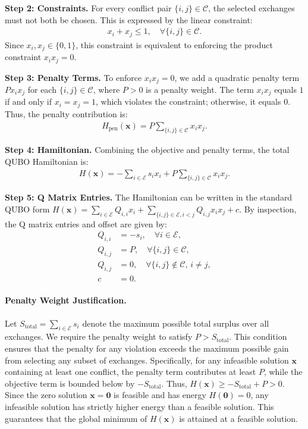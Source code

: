 \documentclass[12pt]{article}
\begin{document}
\textbf{Step 2: Constraints.}
For every conflict pair $\{i, j\} \in \mathcal{C}$, the selected exchanges must not both be chosen. This is expressed by the linear constraint:
\begin{align}
    x_i + x_j \le 1, \quad \forall \{i, j\} \in \mathcal{C}.
\end{align}
Since $x_i, x_j \in \{0, 1\}$, this constraint is equivalent to enforcing the product constraint $x_i x_j = 0$.

\textbf{Step 3: Penalty Terms.}
To enforce $x_i x_j = 0$, we add a quadratic penalty term $P x_i x_j$ for each $\{i, j\} \in \mathcal{C}$, where $P > 0$ is a penalty weight. The term $x_i x_j$ equals $1$ if and only if $x_i = x_j = 1$, which violates the constraint; otherwise, it equals $0$. Thus, the penalty contribution is:
\begin{align}
    H_{\text{pen}}(\mathbf{x}) = P \sum_{\{i, j\} \in \mathcal{C}} x_i x_j.
\end{align}

\textbf{Step 4: Hamiltonian.}
Combining the objective and penalty terms, the total QUBO Hamiltonian is:
\begin{align}
    H(\mathbf{x}) = -\sum_{i \in \mathcal{E}} s_i x_i + P \sum_{\{i, j\} \in \mathcal{C}} x_i x_j.
\end{align}

\textbf{Step 5: Q Matrix Entries.}
The Hamiltonian can be written in the standard QUBO form $H(\mathbf{x}) = \sum_{i \in \mathcal{E}} Q_{i,i} x_i + \sum_{\{i, j\} \in \mathcal{E}, i < j} Q_{i,j} x_i x_j + c$. By inspection, the Q matrix entries and offset are given by:
\begin{align}
    Q_{i,i} &= -s_i, \quad \forall i \in \mathcal{E}, \\
    Q_{i,j} &= P, \quad \forall \{i, j\} \in \mathcal{C}, \\
    Q_{i,j} &= 0, \quad \forall \{i, j\} \notin \mathcal{C}, \, i \neq j, \\
    c &= 0.
\end{align}

\paragraph{Penalty Weight Justification.}
Let $S_{\text{total}} = \sum_{i \in \mathcal{E}} s_i$ denote the maximum possible total surplus over all exchanges. We require the penalty weight to satisfy $P > S_{\text{total}}$. This condition ensures that the penalty for any violation exceeds the maximum possible gain from selecting any subset of exchanges. Specifically, for any infeasible solution $\mathbf{x}$ containing at least one conflict, the penalty term contributes at least $P$, while the objective term is bounded below by $-S_{\text{total}}$. Thus, $H(\mathbf{x}) \ge -S_{\text{total}} + P > 0$. Since the zero solution $\mathbf{x} = \mathbf{0}$ is feasible and has energy $H(\mathbf{0}) = 0$, any infeasible solution has strictly higher energy than a feasible solution. This guarantees that the global minimum of $H(\mathbf{x})$ is attained at a feasible solution.
\end{document}
